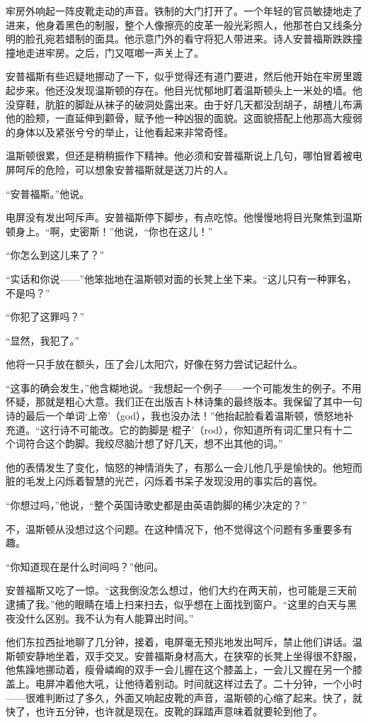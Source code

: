 牢房外响起一阵皮靴走动的声音。铁制的大门打开了。一个年轻的官员敏捷地走了进来，他身着黑色的制服，整个人像擦亮的皮革一般光彩照人，他那苍白又线条分明的脸孔宛若蜡制的面具。他示意门外的看守将犯人带进来。诗人安普福斯跌跌撞撞地走进牢房。之后，门又哐啷一声关上了。

安普福斯有些迟疑地挪动了一下，似乎觉得还有道门要进，然后他开始在牢房里踱起步来。他还没发现温斯顿的存在。他目光忧郁地盯着温斯顿头上一米处的墙。他没穿鞋，肮脏的脚趾从袜子的破洞处露出来。由于好几天都没刮胡子，胡楂儿布满他的脸颊，一直延伸到颧骨，赋予他一种凶狠的面貌。这面貌搭配上他那高大瘦弱的身体以及紧张兮兮的举止，让他看起来非常奇怪。

温斯顿很累，但还是稍稍振作下精神。他必须和安普福斯说上几句，哪怕冒着被电屏呵斥的危险，可以想象安普福斯就是送刀片的人。

``安普福斯。''他说。

电屏没有发出呵斥声。安普福斯停下脚步，有点吃惊。他慢慢地将目光聚焦到温斯顿身上。``啊，史密斯！''他说，``你也在这儿！''

``你怎么到这儿来了？''

``实话和你说------''他笨拙地在温斯顿对面的长凳上坐下来。``这儿只有一种罪名，不是吗？''

``你犯了这罪吗？''

``显然，我犯了。''

他将一只手放在额头，压了会儿太阳穴，好像在努力尝试记起什么。

``这事的确会发生，''他含糊地说。``我想起一个例子------一个可能发生的例子。不用怀疑，那就是粗心大意。我们正在出版吉卜林诗集的最终版本。我保留了其中一句诗的最后一个单词`上帝'（god），我也没办法！''他抬起脸看着温斯顿，愤怒地补充道。``这行诗不可能改。它的韵脚是`棍子'（rod），你知道所有词汇里只有十二个词符合这个韵脚。我绞尽脑汁想了好几天，想不出其他的词。''

他的表情发生了变化，恼怒的神情消失了，有那么一会儿他几乎是愉快的。他短而脏的毛发上闪烁着智慧的光芒，闪烁着书呆子发现没用的事实后的喜悦。

``你想过吗，''他说，``整个英国诗歌史都是由英语韵脚的稀少决定的？''

不，温斯顿从没想过这个问题。在这种情况下，他不觉得这个问题有多重要多有趣。

``你知道现在是什么时间吗？''他问。

安普福斯又吃了一惊。``这我倒没怎么想过，他们大约在两天前，也可能是三天前逮捕了我。''他的眼睛在墙上扫来扫去，似乎想在上面找到窗户。``这里的白天与黑夜没什么区别。我不认为有人能算出时间。''

他们东拉西扯地聊了几分钟，接着，电屏毫无预兆地发出呵斥，禁止他们讲话。温斯顿安静地坐着，双手交叉。安普福斯身材高大，在狭窄的长凳上坐得很不舒服，他焦躁地挪动着，瘦骨嶙峋的双手一会儿握在这个膝盖上，一会儿又握在另一个膝盖上。电屏冲着他大吼，让他待着别动。时间就这样过去了。二十分钟，一个小时------很难判断过了多久，外面又响起皮靴的声音，温斯顿的心缩了起来。快了，就快了，也许五分钟，也许就是现在。皮靴的踩踏声意味着就要轮到他了。

